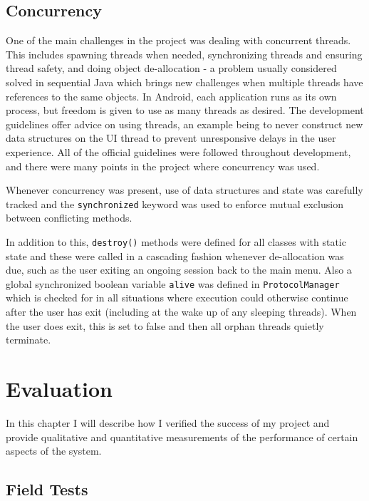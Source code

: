 \section{Concurrency}

One of the main challenges in the project was dealing with concurrent threads. This includes spawning threads when needed, synchronizing threads and ensuring thread safety, and doing object de-allocation - a problem usually considered solved in sequential Java which brings new challenges when multiple threads have references to the same objects.
In Android, each application runs as its own process, but freedom is given to use as many threads as desired. The development guidelines offer advice on using threads, an example being to never construct new data structures on the UI thread to prevent unresponsive delays in the user experience. All of the official guidelines were followed throughout development, and there were many points in the project where concurrency was used.\cite{androidAPI}

Whenever concurrency was present, use of data structures and state was carefully tracked and the {\tt synchronized} keyword was used to enforce mutual exclusion between conflicting methods.

In addition to this, {\tt destroy()} methods were defined for all classes with static state and these were called in a cascading fashion whenever de-allocation was due, such as the user exiting an ongoing session back to the main menu. Also a global synchronized boolean variable {\tt alive} was defined in {\tt ProtocolManager} which is checked for in all situations where execution could otherwise continue after the user has exit (including at the wake up of any sleeping threads). When the user does exit, this is set to false and then all orphan threads quietly terminate.

\cleardoublepage
\chapter{Evaluation}
\label{eval}

In this chapter I will describe how I verified the success of my project and provide qualitative and quantitative measurements of  the performance of certain aspects of the system.

\section{Field Tests}

